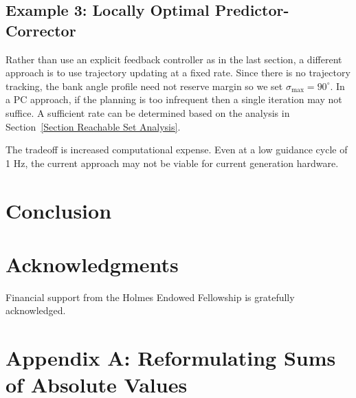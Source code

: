 \documentclass[letterpaper, preprint, paper,11pt]{AAS}	%
\begin{document}
		 
	\subsection{Example 3: Locally Optimal Predictor-Corrector}
	Rather than use an explicit feedback controller as in the last section, a different approach is to use trajectory updating at a fixed rate. Since there is no trajectory tracking, the bank angle profile need not reserve margin so we set $\sigma_{\max}=90^{\circ}$.
	In a PC approach, if the planning is too infrequent then a single iteration may not suffice. A sufficient rate can be determined based on the analysis in Section~\ref{Section Reachable Set Analysis}.
	 
	 The tradeoff is increased computational expense. Even at a low guidance cycle of 1 Hz, the current approach may not be viable for current generation hardware. 
	
	
	\section{Conclusion}
	
	\section{Acknowledgments}
	Financial support from the Holmes Endowed Fellowship is gratefully acknowledged.

	\appendix
	\section{Appendix A: Reformulating Sums of Absolute Values}
\end{document}
